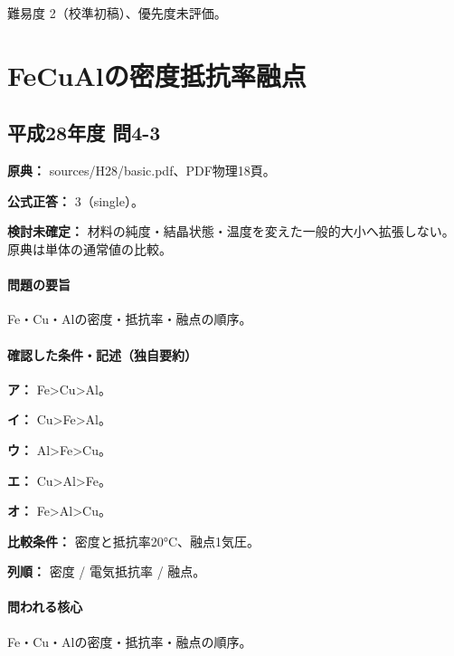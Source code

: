 \par 難易度 2（校準初稿）、優先度未評価。

\section{FeCuAlの密度抵抗率融点}

\subsection{平成28年度 問4-3}
\label{q:h28-reg-basic-4-3}

\noindent\textbf{原典：} sources/H28/basic.pdf、PDF物理18頁。

\textbf{公式正答：} 3（single）。

\par\textbf{検討未確定：} 材料の純度・結晶状態・温度を変えた一般的大小へ拡張しない。原典は単体の通常値の比較。

\paragraph{問題の要旨} Fe・Cu・Alの密度・抵抗率・融点の順序。

\paragraph{確認した条件・記述（独自要約）}\mbox{}\par

\noindent\textbf{ア：} Fe>Cu>Al。\par

\noindent\textbf{イ：} Cu>Fe>Al。\par

\noindent\textbf{ウ：} Al>Fe>Cu。\par

\noindent\textbf{エ：} Cu>Al>Fe。\par

\noindent\textbf{オ：} Fe>Al>Cu。\par

\noindent\textbf{比較条件：} 密度と抵抗率20°C、融点1気圧。\par

\noindent\textbf{列順：} 密度 / 電気抵抗率 / 融点。\par

\paragraph{問われる核心} Fe・Cu・Alの密度・抵抗率・融点の順序。

